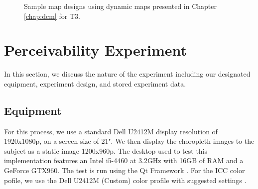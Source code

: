 \begin{figure}[t]
\centering
{} 
\caption{Sample map designs using dynamic maps presented in Chapter \ref{chap:dcm} for T3.} \label{fig:samplet3}
\end{figure}
\section{Perceivability Experiment} \label{sec:experiment}
In this section, we discuss the nature of the experiment including our designated equipment, experiment design, and stored experiment data.
\subsection{Equipment} \label{sec:equipment}
For this process, we use a standard Dell U2412M display resolution of 1920x1080p, on a screen size of 21". We then display the choropleth images to the subject as a static image 1200x960p. The desktop used to test this implementation features an Intel i5-4460 at 3.2GHz with 16GB of RAM and a GeForce GTX960. The test is run using the Qt Framework \cite{Qt}. For the ICC color pofile, we use the Dell U2412M (Custom) color profile with suggested settings \cite{icc}.
